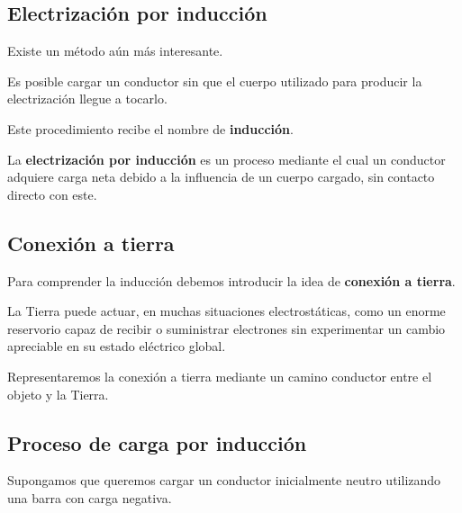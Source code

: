 
\subsection{Electrización por inducción}

Existe un método aún más interesante.

Es posible cargar un conductor sin que el cuerpo utilizado para producir la
electrización llegue a tocarlo.

Este procedimiento recibe el nombre de \textbf{inducción}.

\begin{definicion}
La \textbf{electrización por inducción} es un proceso mediante el cual un
conductor adquiere carga neta debido a la influencia de un cuerpo cargado,
sin contacto directo con este.
\end{definicion}



\subsection{Conexión a tierra}

Para comprender la inducción debemos introducir la idea de
\textbf{conexión a tierra}.

La Tierra puede actuar, en muchas situaciones electrostáticas, como un enorme
reservorio capaz de recibir o suministrar electrones sin experimentar un
cambio apreciable en su estado eléctrico global.

Representaremos la conexión a tierra mediante un camino conductor entre el
objeto y la Tierra.



\subsection{Proceso de carga por inducción}

Supongamos que queremos cargar un conductor inicialmente neutro utilizando
una barra con carga negativa.


